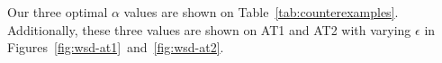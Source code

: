 Our three optimal $\alpha$ values are shown on Table~\ref{tab:counterexamples}. Additionally, these three values are shown on AT1 and AT2 with varying $\epsilon$ in Figures~\ref{fig:wsd-at1}~and~\ref{fig:wsd-at2}.






















